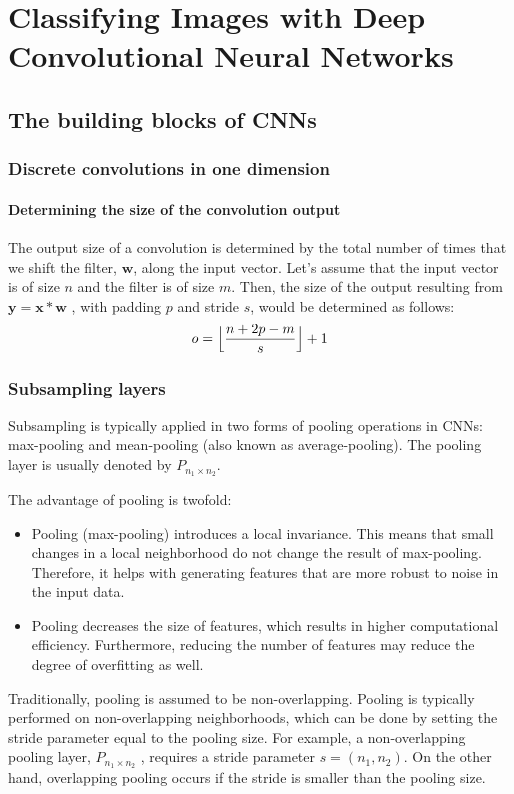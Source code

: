 \chapter{Classifying Images with Deep Convolutional Neural Networks\label{Ch14}}
\section{The building blocks of CNNs}
\subsection{Discrete convolutions in one dimension}
\subsubsection*{Determining the size of the convolution output}
The output size of a convolution is determined by the total number of times that we shift the filter, $\bm{w}$, along the input vector. Let's assume that the input vector is of size $n$ and the filter is of size $m$. Then, the size of the output resulting from $\bm{y}=\bm{x}*\bm{w}$ , with padding $p$ and stride $s$, would be determined as follows:
\begin{equation}
    o=\Bigl\lfloor\frac{n+2p-m}{s}\Bigr\rfloor+1
\end{equation}

\subsection{Subsampling layers}
Subsampling is typically applied in two forms of pooling operations in CNNs: max-pooling and
mean-pooling (also known as average-pooling). The pooling layer is usually denoted by $P_{n_1\times n_2}$.

The advantage of pooling is twofold:
\begin{itemize}
    \item Pooling (max-pooling) introduces a local invariance. This means that small changes in a local neighborhood do not change the result of max-pooling. Therefore, it helps with generating features that are more robust to noise in the input data.
    \item Pooling decreases the size of features, which results in higher computational efficiency. Furthermore, reducing the number of features may reduce the degree of overfitting as well.
\end{itemize}

\begin{tcolorbox}[title=Overlapping versus non-overlapping pooling]
    Traditionally, pooling is assumed to be non-overlapping. Pooling is typically performed on non-overlapping neighborhoods, which can be done by setting the stride parameter equal to the pooling size. For example, a non-overlapping pooling layer, $P_{n_1\times n_2}$ , requires a stride parameter $s = (n_1, n_2)$. On the other hand, overlapping pooling occurs if the stride is smaller than the pooling size.
\end{tcolorbox}
